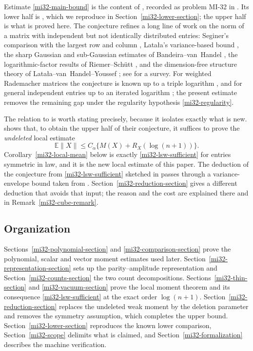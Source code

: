 \documentclass[11pt]{article}
\theoremstyle{definition}
\theoremstyle{remark}
\newcommand{\E}{\mathbb E}
\newcommand{\norm}[1]{\lVert#1\rVert}
\begin{document}
Estimate \eqref{mi32-main-bound} is the content of
\cite[Conjecture~4.3]{LatalaSwiatkowski}, recorded as problem MI-32 in
\cite{MI32}. Its lower half is
\cite[Theorem~4.1]{LatalaSwiatkowski}, which we reproduce in
Section~\ref{mi32-lower-section}; the upper half is what is proved
here. The conjecture refines a long line of work on the norm of a
matrix with independent but not identically distributed entries:
Seginer's comparison with the largest row and column
\cite{Seginer}, Lata\l a's variance-based bound \cite{Latala2005}, the
sharp Gaussian and sub-Gaussian estimates of Bandeira--van~Handel
\cite{BandeiraVanHandel}, the logarithmic-factor results of
Riemer--Sch\"utt \cite{RiemerSchutt}, and the dimension-free structure
theory of Lata\l a--van~Handel--Youssef \cite{LatalaVanHandelYoussef};
see \cite{VanHandelSurvey} for a survey. For weighted Rademacher
matrices the conjecture is known up to a triple logarithm
\cite{Latala2024}, and for general independent entries up to an
iterated logarithm \cite{Meller}; the present estimate removes the
remaining gap under the regularity hypothesis
\eqref{mi32-regularity}.

The relation to \cite{LatalaSwiatkowski} is worth stating precisely,
because it isolates exactly what is new.
\cite[Remark~4.5]{LatalaSwiatkowski} shows that, to obtain the upper
half of their conjecture, it suffices to prove the \emph{undeleted}
local estimate
\begin{equation}\label{mi32-lsw-sufficient}
 \E\norm{X}\le C_\alpha\bigl\{M(X)+R_X(\log(n+1))\bigr\}.
\end{equation}
Corollary~\ref{mi32-local-mean} below is exactly
\eqref{mi32-lsw-sufficient} for entries symmetric in law, and it is the
new local estimate of this paper. The deduction of the conjecture from
\eqref{mi32-lsw-sufficient} sketched in
\cite[Remark~4.5]{LatalaSwiatkowski} passes through a variance-envelope
bound taken from \cite[Theorem~4.4]{LatalaVanHandelYoussef}.
Section~\ref{mi32-reduction-section} gives a different deduction that
avoids that input; the reason and the cost are explained there and in
Remark~\ref{mi32-cube-remark}.

\subsection{Organization}

Sections~\ref{mi32-polynomial-section} and
\ref{mi32-comparison-section} prove the polynomial, scalar and vector
moment estimates used later. Section~\ref{mi32-representation-section}
sets up the parity--amplitude representation and
Section~\ref{mi32-counts-section} the two count decompositions.
Sections~\ref{mi32-thin-section} and \ref{mi32-vacuum-section} prove the
local moment theorem and its consequence
\eqref{mi32-lsw-sufficient} at the exact order $\log(n+1)$.
Section~\ref{mi32-reduction-section} replaces the undeleted weak moment
by the deletion parameter and removes the symmetry assumption, which
completes the upper bound. Section~\ref{mi32-lower-section} reproduces
the known lower comparison, Section~\ref{mi32-scope} delimits what is
claimed, and Section~\ref{mi32-formalization} describes the machine
verification.
\end{document}
